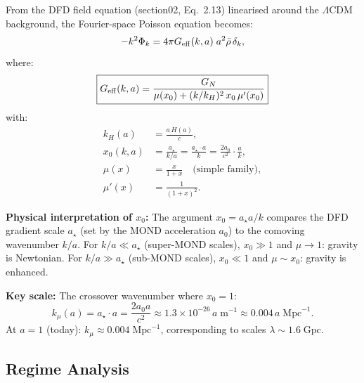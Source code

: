 \documentclass[11pt]{article}
\theoremstyle{definition}
\theoremstyle{remark}
\newcommand{\ee}[1]{\times 10^{#1}}
\newcommand{\astar}{a_\star}
\newcommand{\LCDM}{$\Lambda$CDM}
\begin{document}
From the DFD field equation (section02, Eq.~2.13) linearised around the
\LCDM{} background, the Fourier-space Poisson equation becomes:
\begin{equation}
  -k^2 \Phi_k = 4\pi G_{\rm eff}(k,a)\; a^2 \bar\rho\, \delta_k,
  \label{eq:poisson-geff}
\end{equation}
where:
\begin{equation}
  \boxed{
  G_{\rm eff}(k,a) = \frac{G_N}{\mu(x_0) + (k/k_H)^2\, x_0\, \mu'(x_0)}
  }
  \label{eq:geff-master}
\end{equation}
with:
\begin{align}
  k_H(a) &= \frac{a\, H(a)}{c}, \label{eq:kH} \\
  x_0(k,a) &= \frac{\astar}{k/a} = \frac{\astar \cdot a}{k}
    = \frac{2a_0}{c^2} \cdot \frac{a}{k}, \label{eq:x0} \\
  \mu(x) &= \frac{x}{1+x} \quad \text{(simple family)}, \label{eq:mu-simple} \\
  \mu'(x) &= \frac{1}{(1+x)^2}. \label{eq:mu-prime}
\end{align}

\textbf{Physical interpretation of $x_0$:} The argument $x_0 = \astar a / k$
compares the DFD gradient scale $\astar$ (set by the MOND acceleration $a_0$)
to the comoving wavenumber $k/a$. For $k/a \ll \astar$ (super-MOND scales),
$x_0 \gg 1$ and $\mu \to 1$: gravity is Newtonian. For $k/a \gg \astar$
(sub-MOND scales), $x_0 \ll 1$ and $\mu \sim x_0$: gravity is enhanced.

\textbf{Key scale:} The crossover wavenumber where $x_0 = 1$:
\begin{equation}
  k_\mu(a) = \astar \cdot a = \frac{2a_0 a}{c^2}
  \approx 1.3 \ee{-26}\, a \;\text{m}^{-1}
  \approx 0.004\, a \;\text{Mpc}^{-1}.
  \label{eq:kmu}
\end{equation}
At $a = 1$ (today): $k_\mu \approx 0.004\;\text{Mpc}^{-1}$, corresponding
to scales $\lambda \sim 1.6\;\text{Gpc}$.

\subsection{Regime Analysis}
\end{document}
